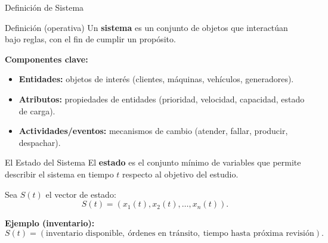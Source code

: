 \documentclass[aspectratio=1610, 9pt]{beamer}
\begin{document}
\begin{frame}{Definición de Sistema}
\begin{block}{Definición (operativa)}
Un \textbf{sistema} es un conjunto de objetos que interactúan bajo reglas, con el fin de cumplir un propósito.
\end{block}

\vspace{0.3cm}
\textbf{Componentes clave:}
\begin{itemize}
  \item \textbf{Entidades:} objetos de interés (clientes, máquinas, vehículos, generadores).
  \item \textbf{Atributos:} propiedades de entidades (prioridad, velocidad, capacidad, estado de carga).
  \item \textbf{Actividades/eventos:} mecanismos de cambio (atender, fallar, producir, despachar).
\end{itemize}
\end{frame}

\begin{frame}{El Estado del Sistema}
El \textbf{estado} es el conjunto mínimo de variables que permite describir el sistema en tiempo $t$ respecto al objetivo del estudio.

\vspace{0.3cm}
Sea $S(t)$ el vector de estado:
\[
S(t) = (x_1(t), x_2(t), \dots, x_n(t)).
\]

\textbf{Ejemplo (inventario):}
\[
S(t) = (\text{inventario disponible},\ \text{órdenes en tránsito},\ \text{tiempo hasta próxima revisión}).
\]
\end{frame}
\end{document}
